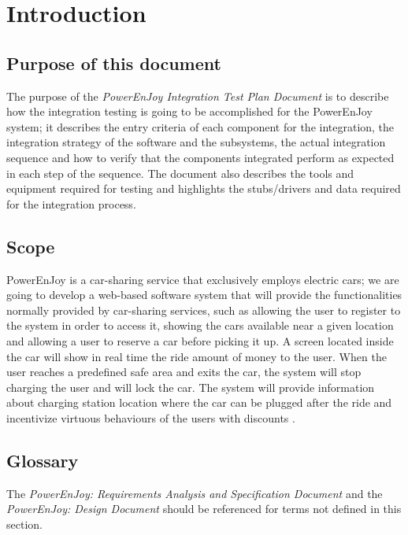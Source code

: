\section{Introduction}

\subsection{Purpose of this document}
The purpose of the \emph{PowerEnJoy Integration Test Plan Document} is to describe how the integration testing is going to be accomplished for the PowerEnJoy system; it describes the entry criteria of each component for the integration, the integration strategy of the software and the subsystems, the actual integration sequence and how to verify that the components integrated perform as expected in each step of the sequence. The document also describes the tools and equipment required for testing and highlights the stubs/drivers and data required for the integration process.

\subsection{Scope}
PowerEnJoy is a car-sharing service that exclusively employs electric cars; we are going to develop a web-based software system that will provide the functionalities normally provided by car-sharing services, such as allowing the user to register to the system in order to access it, showing the cars available near a given location and allowing a user to reserve a car before picking it up.
A screen located inside the car will show in real time the ride amount of money to the user. When the user reaches a predefined safe area and exits the car, the system will stop charging the user and will lock the car. The system will provide information about charging station location where the car can be plugged after the ride and incentivize virtuous behaviours of the users with discounts \cite{RASD}.

\subsection{Glossary}
The \emph{PowerEnJoy: Requirements Analysis and Specification Document} \cite{RASD} and the \emph{PowerEnJoy: Design Document} \cite{DD} should be referenced for terms not defined in this section.

